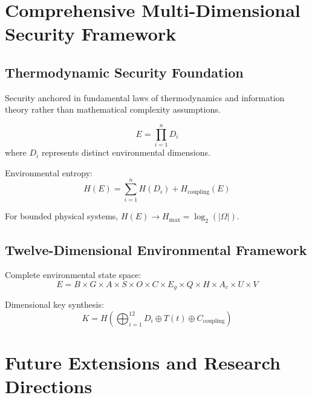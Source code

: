 ﻿\documentclass[11pt,a4paper]{article}
\begin{document}
\begin{itemize}
\begin{itemize}
\section{Comprehensive Multi-Dimensional Security Framework}

\subsection{Thermodynamic Security Foundation}

Security anchored in fundamental laws of thermodynamics and information theory rather than mathematical complexity assumptions.

\begin{definition}
\begin{equation}
E = \prod_{i=1}^n D_i
\end{equation}
where $D_i$ represents distinct environmental dimensions.
\end{definition}

Environmental entropy:
\begin{equation}
H(E) = \sum_{i=1}^n H(D_i) + H_{\text{coupling}}(E)
\end{equation}

\begin{theorem}
For bounded physical systems, $H(E) \rightarrow H_{\max} = \log_2(|\Omega|)$.
\end{theorem}

\subsection{Twelve-Dimensional Environmental Framework}

Complete environmental state space:
\begin{equation}
E = B \times G \times A \times S \times O \times C \times E_g \times Q \times H \times A_c \times U \times V
\end{equation}

Dimensional key synthesis:
\begin{equation}
K = H\left(\bigoplus_{i=1}^{12} D_i \oplus T(t) \oplus C_{\text{coupling}}\right)
\end{equation}

\section{Future Extensions and Research Directions}


\end{itemize}
\end{itemize}
\end{document}
